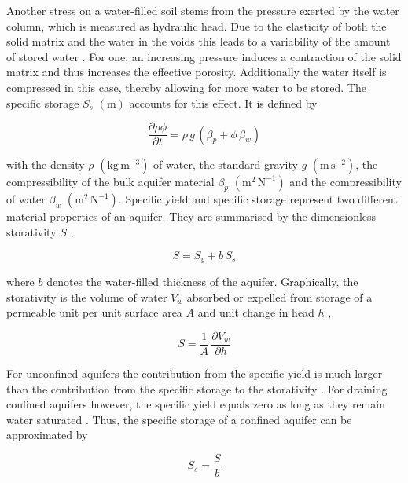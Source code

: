 Another stress on a water-filled soil stems from the pressure exerted by the water column, which is measured as hydraulic head. 
Due to the elasticity of both the solid matrix and the water in the voids this leads to a variability of the amount of stored water \parencite{Fetter.2001}. 
For one, an increasing pressure induces a contraction of the solid matrix and thus increases the effective porosity. 
Additionally the water itself is compressed in this case, thereby allowing for more water to be stored. 
The specific storage $S_s$ $(\textrm{m})$ accounts for this effect. 
It is defined by

\begin{equation}
    \frac{\partial \rho \phi}{\partial t} = \rho \, g \, \left( \beta_p + \phi \, \beta_w \right)
\end{equation}

\noindent with the density $\rho$ $(\textrm{kg} \, \textrm{m}^{-3})$ of water, the standard gravity $g$ $(\textrm{m} \, \textrm{s}^{-2})$, the compressibility of the bulk aquifer material $\beta_p$ $(\textrm{m}^{2} \, \textrm{N}^{-1})$ and the compressibility of water $\beta_w$ $(\textrm{m}^{2} \, \textrm{N}^{-1})$. 
Specific yield and specific storage represent two different material properties of an aquifer. 
They are summarised by the dimensionless storativity $S$ \parencite{Fetter.2001},

\begin{equation}
    \label{Eq-Storativity}
    S = S_y + b \, S_s
\end{equation}

\noindent where $b$ denotes the water-filled thickness of the aquifer. 
Graphically, the storativity is the volume of water $V_w$ absorbed or expelled from storage of a permeable unit per unit surface area $A$ and unit change in head $h$ \parencite{Fetter.2001},

\begin{equation}
    S = \frac{1}{A} \, \frac{\partial V_w}{\partial h}
\end{equation}

For unconfined aquifers the contribution from the specific yield is much larger than the contribution from the specific storage to the storativity \parencite{Todd.2005}. 
For draining confined aquifers however, the specific yield equals zero as long as they remain water saturated \parencite{Fetter.2001}. 
Thus, the specific storage of a confined aquifer can be approximated by

\begin{equation}
    \label{Eq-SsSy}
    S_s = \frac{S}{b}
\end{equation}

